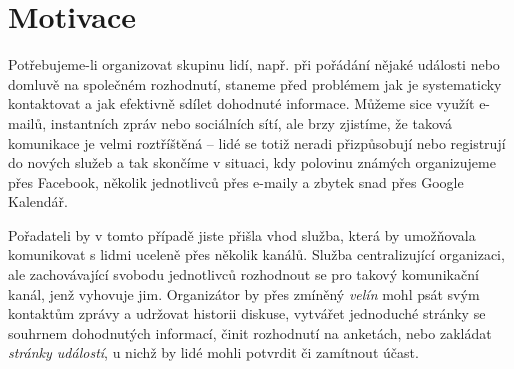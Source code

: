 \documentclass[12pt,oneside,final]{fithesis2}
\begin{document}







\chapter{Motivace}\label{motivation}
Potřebujeme-li organizovat skupinu lidí, např. při pořádání nějaké události nebo domluvě na společném rozhodnutí, staneme před problémem jak je systematicky kontaktovat a jak efektivně sdílet dohodnuté informace. Můžeme sice využít e-mailů, instantních zpráv nebo sociálních sítí, ale brzy zjistíme, že taková komunikace je velmi roztříštěná -- lidé se totiž neradi přizpůsobují nebo registrují do nových služeb \cite{grudin1994groupware} a tak skončíme v situaci, kdy polovinu známých organizujeme přes Facebook, několik jednotlivců přes e-maily a zbytek snad přes Google Kalendář.

Pořadateli by v tomto případě jiste přišla vhod služba, která by u\-mož\-ňo\-va\-la komunikovat s lidmi uceleně přes několik kanálů. Služba centralizující organizaci, ale zachovávající svobodu jednotlivců rozhodnout se pro takový komunikační kanál, jenž vyhovuje jim. Organizátor by přes zmíněný {\it velín} mohl psát svým kontaktům zprávy a udržovat historii diskuse, vytvářet jednoduché stránky se souhrnem dohodnutých informací, činit rozhodnutí na anketách, nebo zakládat {\it stránky událostí}, u nichž by lidé mohli potvrdit či zamítnout účast.
\end{document}

